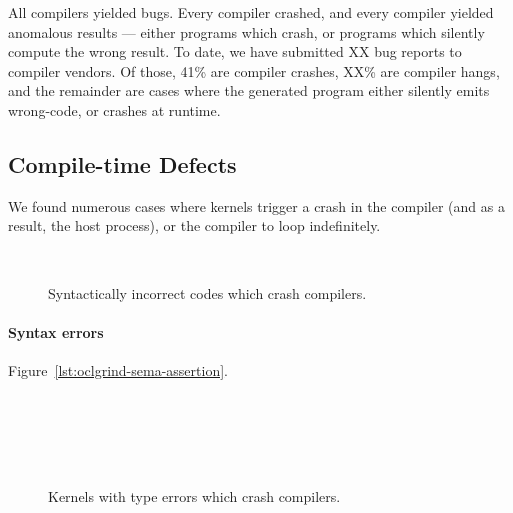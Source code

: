  All compilers yielded bugs. Every compiler crashed, and every compiler yielded anomalous results --- either programs which crash, or programs which silently compute the wrong result. To date, we have submitted XX bug reports to compiler vendors. Of those, 41\% are compiler crashes, XX\% are compiler hangs, and the remainder are cases where the generated program either silently emits wrong-code, or crashes at runtime. 


\subsection{Compile-time Defects}%
\label{subsec:compile-time-defects}

We found numerous cases where kernels trigger a crash in the compiler (and as a result, the host process), or the compiler to loop indefinitely.

\begin{figure}
  \centering %
  \\%
  \caption{Syntactically incorrect codes which crash compilers.}
  \label{lst:bad-syntax}
\end{figure}


\paragraph{Syntax errors} Figure~\ref{lst:oclgrind-sema-assertion}.

\begin{figure}
  \centering
  \\%
  \\%
  \\%
  \\%
  \caption{Kernels with type errors which crash compilers.}
  \label{}
\end{figure}



